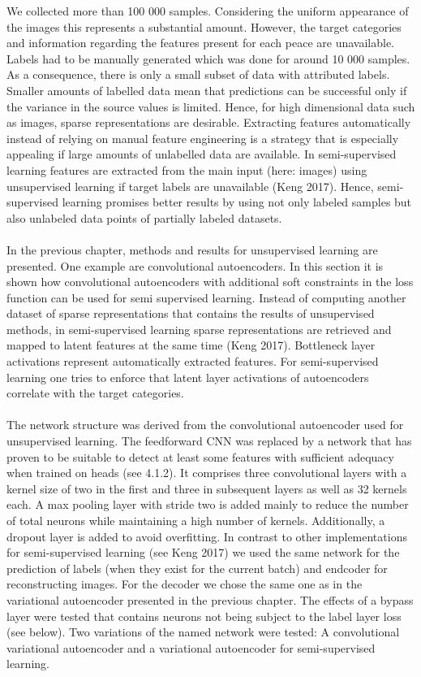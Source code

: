 We collected more than 100 000 samples. Considering the uniform appearance of the images this represents a substantial amount. However, the target categories and information regarding the features present for each peace are unavailable. Labels had to be manually generated which was done for around 10 000 samples. As a consequence, there is only a small subset of data with attributed labels. Smaller amounts of labelled data mean that predictions can be successful only if the variance in the source values is limited. Hence, for high dimensional data such as images, sparse representations are desirable. Extracting features automatically instead of relying on manual feature engineering is a strategy that is especially appealing if large amounts of unlabelled data are available. In semi-supervised learning features are extracted from the main input (here: images) using unsupervised learning if target labels are unavailable (Keng 2017). Hence, semi-supervised learning promises better results by using not only labeled samples but also unlabeled data points of partially labeled datasets.\\
\\
In the previous chapter, methods and results for unsupervised learning are presented. One example are convolutional autoencoders. In this section it is shown how convolutional autoencoders with additional soft constraints in the loss function can be used for semi supervised learning. Instead of computing another dataset of sparse representations that contains the results of unsupervised methods, in semi-supervised learning sparse representations are retrieved and mapped to latent features at the same time (Keng 2017). Bottleneck layer activations represent automatically extracted features. For semi-supervised learning one tries to enforce that latent layer activations of autoencoders correlate with the target categories. \\
\\
The network structure was derived from the convolutional autoencoder used for unsupervised learning. The feedforward CNN was replaced by a network that has proven to be suitable to detect at least some features with sufficient adequacy when trained on heads (see 4.1.2). It comprises three convolutional layers with a kernel size of two in the first and three in subsequent layers as well as 32 kernels each. A max pooling layer with stride two is added mainly to reduce the number of total neurons while maintaining a high number of kernels. Additionally, a dropout layer is added to avoid overfitting. In contrast to other implementations for semi-supervised learning (see Keng 2017)  we used the same network for the prediction of labels (when they exist for the current batch) and endcoder for reconstructing images. For the decoder we chose the same one as in the variational autoencoder presented in the previous chapter. The effects of a bypass layer were tested that contains neurons not being subject to the label layer loss (see below). Two variations of the named network were tested: A convolutional variational autoencoder and a variational autoencoder for semi-supervised learning.\\

